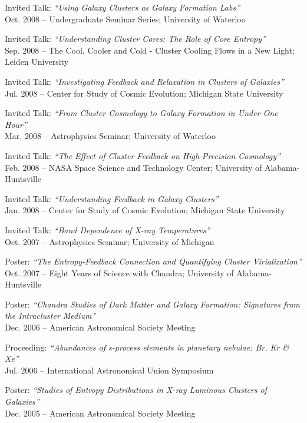 \documentclass[12pt]{cv}
\begin{document}
\begin{llist}
{\sc Invited Talk: {\textit{``Using Galaxy Clusters as Galaxy Formation Labs''}}}\\
Oct. 2008 -- Undergraduate Seminar Series; University of Waterloo

{\sc Invited Talk: {\textit{``Understanding Cluster Cores: The Role of Core Entropy''}}}\\
Sep. 2008 -- The Cool, Cooler and Cold - Cluster Cooling Flows in a New Light; Leiden University

{\sc Invited Talk: {\textit{``Investigating Feedback and Relaxation in Clusters of Galaxies''}}}\\
Jul. 2008 -- Center for Study of Cosmic Evolution; Michigan State University

{\sc Invited Talk: {\textit{``From Cluster Cosmology to Galaxy Formation in Under One Hour''}}}\\
Mar. 2008 -- Astrophysics Seminar; University of Waterloo

{\sc Invited Talk: {\textit{``The Effect of Cluster Feedback on High-Precision Cosmology''}}}\\
Feb. 2008 -- NASA Space Science and Technology Center; University of Alabama-Huntsville

{\sc Invited Talk: {\textit{``Understanding Feedback in Galaxy Clusters''}}}\\
Jan. 2008 -- Center for Study of Cosmic Evolution; Michigan State University

{\sc Invited Talk: {\textit{``Band Dependence of X-ray Temperatures''}}}\\
Oct. 2007 -- Astrophysics Seminar; University of Michigan

{\sc Poster: {\textit{``The Entropy-Feedback Connection and Quantifying Cluster Virialization''}}}\\
Oct. 2007 -- Eight Years of Science with Chandra; University of Alabama-Huntsville

{\sc Poster: {\textit{``Chandra Studies of Dark Matter and Galaxy Formation: Signatures from the Intracluster Medium''}}}\\
Dec. 2006 -- American Astronomical Society Meeting

{\sc Proceeding: {\textit{``Abundances of s-process elements in planetary nebulae: Br, Kr \& Xe''}}}\\
Jul. 2006 -- International Astronomical Union Symposium

{\sc Poster: {\textit{``Studies of Entropy Distributions in X-ray Luminous Clusters of Galaxies''}}}\\
Dec. 2005 -- American Astronomical Society Meeting


\end{llist}
\end{document}

